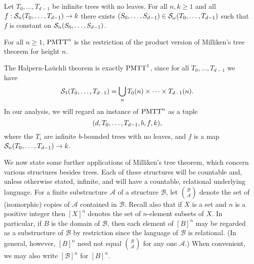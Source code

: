 
\begin{theorem}\label{th:product-MTT}
	Let $T_0,\ldots,T_{d-1}$ be infinite trees with no leaves. For all $n,k \geq 1$ and all $f: \mathcal{S}_{n}({T_0,\ldots,T_{d-1}}) \to k$ there exists $(S_0,\ldots,S_{d-1}) \in \mathcal{S}_{\omega}({T_0,\ldots,T_{d-1}})$ such that $f$ is constant on $\mathcal{S}_{n}({S_0,\ldots,S_{d-1}})$.
\end{theorem}

\begin{statement}
  For all $n \geq 1$, $\mathrm{PMTT}^{n}_{}$ is the restriction of the product version of Milliken's tree theorem for height $n$.
\end{statement}

\noindent The Halpern-La\"{u}chli theorem is exactly $\mathrm{PMTT}^{1}_{}$, since for all $T_0,\ldots,T_{d-1}$ we have
\[
	\mathcal{S}_{1}({T_0,\dots, T_{d-1}})=\bigcup_{n}T_0(n)\times\dots\times T_{d-1}(n).
\]
In our analysis, we will regard an instance of $\mathrm{PMTT}^{n}_{}$ as a tuple
\[
	( d,T_0,\ldots,T_{d-1},b,f,k ),
\]
where the $T_i$ are infinite $b$-bounded trees with no leaves, and $f$ is a map $\mathcal{S}_{n}({T_0,\ldots,T_{d-1}}) \to k$.

We now state some further applications of Milliken's tree theorem, which concern various structures besides trees. Each of these structures will be countable and, unless otherwise stated, infinite, and will have a countable, relational underlying language. For a finite substructure $\mathcal{A}$ of a structure $\mathcal{B}$, let %
$\mathcal{B} \choose \mathcal{A}$ 
denote the set of (isomorphic) copies of $\mathcal{A}$ contained in $\mathcal{B}$. Recall also that if $X$ is a set and $n$ is a positive integer then $[X]^n$  denotes the set of $n$-element subsets of $X$. In particular, if $B$ is the domain of $\mathcal{B}$, then each element of $[B]^n$ may be regarded as a substructure of $\mathcal{B}$ by restriction since the language of $\mathcal{B}$ is relational. (In general, however, $[B]^n$ need not equal $\mathcal{B} \choose \mathcal{A}$ for any one $\mathcal{A}$.) When convenient, we may also write $[\mathcal{B}]^n$ for $[B]^n$.

